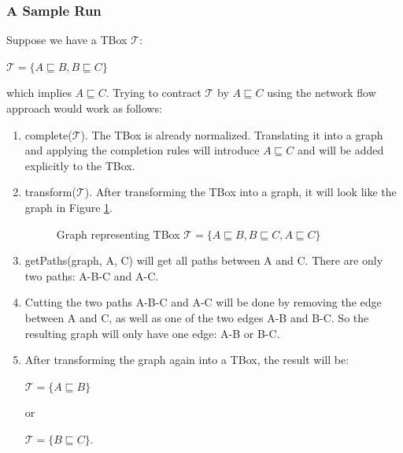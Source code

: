 \documentclass{sfuthesis}
\theoremstyle{plain}
\theoremstyle{definition}
\begin{document}
\subsubsection{A Sample Run}
Suppose we have a TBox $\mathcal{T}$:
\begin{center}
$\mathcal{T} = \lbrace A \sqsubseteq B, B \sqsubseteq C \rbrace$
\end{center}
which implies $A \sqsubseteq C$. Trying to contract $\mathcal{T}$ by $A \sqsubseteq C$ using the network flow approach would work as follows:
\begin{enumerate}
\item complete($\mathcal{T}$). 
The TBox is already normalized. Translating it into a graph and applying the completion rules will introduce $A \sqsubseteq C$ and will be added explicitly to the TBox.
\item transform($\mathcal{T}$).
After transforming the TBox into a graph, it will look like the graph in Figure \ref{fig:abc-kb}.

\begin{figure}
\centering
{}
\caption{Graph representing TBox $\mathcal{T} = \lbrace A \sqsubseteq B, B \sqsubseteq C, A \sqsubseteq C \rbrace $}
\label{fig:abc-kb}
\end{figure}

\item getPaths(graph, A, C) will get all paths between A and C. There are only two paths: A-B-C and A-C. 

\item Cutting the two paths A-B-C and A-C will be done by removing the edge between A and C, as well as one of the two edges A-B and B-C. So the resulting graph will only have one edge: A-B or B-C.

\item After transforming the graph again into a TBox, the result will be:
\begin{center}
$\mathcal{T} = \lbrace A \sqsubseteq B \rbrace$
\end{center}
or 
\begin{center}
$\mathcal{T} = \lbrace B \sqsubseteq C \rbrace$.
\end{center}

\end{enumerate}
\end{document}
